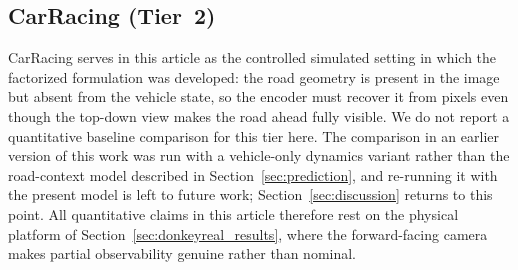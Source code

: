 \documentclass[preprint,12pt]{elsarticle}
\begin{document}
\subsection{CarRacing (Tier~2)}\label{sec:carracing_results}

CarRacing serves in this article as the controlled simulated setting in which the
factorized formulation was developed: the road geometry is present in the image
but absent from the vehicle state, so the encoder must recover it from pixels
even though the top-down view makes the road ahead fully visible.
We do not report a quantitative baseline comparison for this tier here.
The comparison in an earlier version of this work was run with a vehicle-only
dynamics variant rather than the road-context model described in
Section~\ref{sec:prediction}, and re-running it with the present model is left to
future work; Section~\ref{sec:discussion} returns to this point.
All quantitative claims in this article therefore rest on the physical platform
of Section~\ref{sec:donkeyreal_results}, where the forward-facing camera makes
partial observability genuine rather than nominal.
\end{document}
